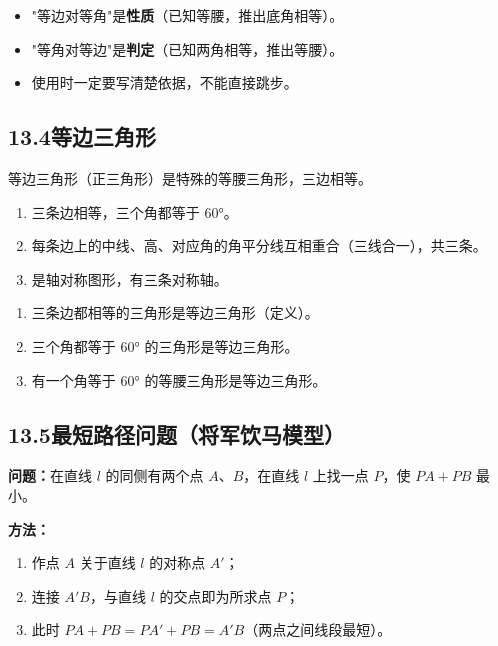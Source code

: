 \documentclass[12pt, a4paper]{ctexart}
\begin{document}
\begin{warnbox}
\begin{itemize}[nosep]
  \item "等边对等角"是\textbf{性质}（已知等腰，推出底角相等）。
  \item "等角对等边"是\textbf{判定}（已知两角相等，推出等腰）。
  \item 使用时一定要写清楚依据，不能直接跳步。
\end{itemize}
\end{warnbox}

\subsection*{13.4\quad 等边三角形}

\begin{knowledgebox}[等边三角形的性质]
等边三角形（正三角形）是特殊的等腰三角形，三边相等。
\begin{enumerate}[nosep]
  \item 三条边相等，三个角都等于 $60°$。
  \item 每条边上的中线、高、对应角的角平分线互相重合（三线合一），共三条。
  \item 是轴对称图形，有三条对称轴。
\end{enumerate}
\end{knowledgebox}

\begin{knowledgebox}[等边三角形的判定]
\begin{enumerate}[nosep]
  \item 三条边都相等的三角形是等边三角形（定义）。
  \item 三个角都等于 $60°$ 的三角形是等边三角形。
  \item 有一个角等于 $60°$ 的等腰三角形是等边三角形。
\end{enumerate}
\end{knowledgebox}

\subsection*{13.5\quad 最短路径问题（将军饮马模型）}

\begin{knowledgebox}[将军饮马问题]
\textbf{问题：}在直线 $l$ 的同侧有两个点 $A$、$B$，在直线 $l$ 上找一点 $P$，使 $PA + PB$ 最小。

\textbf{方法：}
\begin{enumerate}[nosep]
  \item 作点 $A$ 关于直线 $l$ 的对称点 $A'$；
  \item 连接 $A'B$，与直线 $l$ 的交点即为所求点 $P$；
  \item 此时 $PA + PB = PA' + PB = A'B$（两点之间线段最短）。
\end{enumerate}
\end{knowledgebox}
\end{document}
